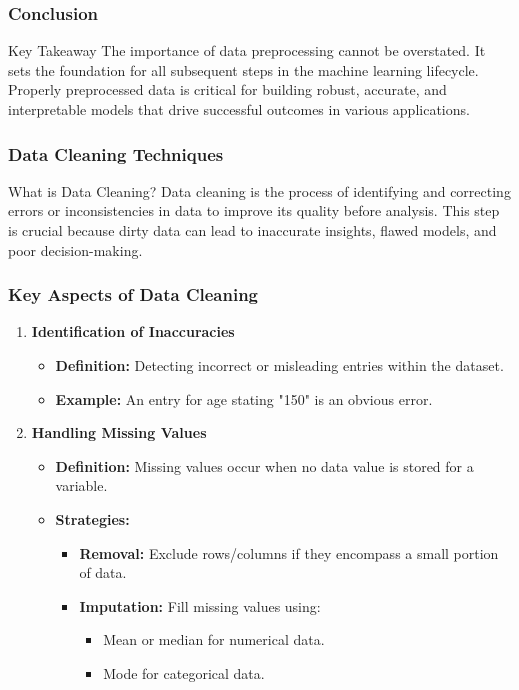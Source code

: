 \documentclass[aspectratio=169]{beamer}
\begin{document}
\begin{frame}[fragile]
    \frametitle{Conclusion}
    \begin{block}{Key Takeaway}
        The importance of data preprocessing cannot be overstated. It sets the foundation for all subsequent steps in the machine learning lifecycle.
        Properly preprocessed data is critical for building robust, accurate, and interpretable models that drive successful outcomes in various applications.
    \end{block}
\end{frame}

\begin{frame}[fragile]
  \frametitle{Data Cleaning Techniques}
  \begin{block}{What is Data Cleaning?}
    Data cleaning is the process of identifying and correcting errors or inconsistencies in data to improve its quality before analysis. This step is crucial because dirty data can lead to inaccurate insights, flawed models, and poor decision-making.
  \end{block}
\end{frame}

\begin{frame}[fragile]
  \frametitle{Key Aspects of Data Cleaning}
  \begin{enumerate}
    \item \textbf{Identification of Inaccuracies}
    \begin{itemize}
      \item \textbf{Definition:} Detecting incorrect or misleading entries within the dataset.
      \item \textbf{Example:} An entry for age stating "150" is an obvious error.
    \end{itemize}

    \item \textbf{Handling Missing Values}
    \begin{itemize}
      \item \textbf{Definition:} Missing values occur when no data value is stored for a variable.
      \item \textbf{Strategies:}
      \begin{itemize}
        \item \textbf{Removal:} Exclude rows/columns if they encompass a small portion of data.
        \item \textbf{Imputation:} Fill missing values using:
        \begin{itemize}
          \item Mean or median for numerical data.
          \item Mode for categorical data.
        \end{itemize}
      \end{itemize}
    \end{itemize}
  \end{enumerate}
\end{frame}
\end{document}
